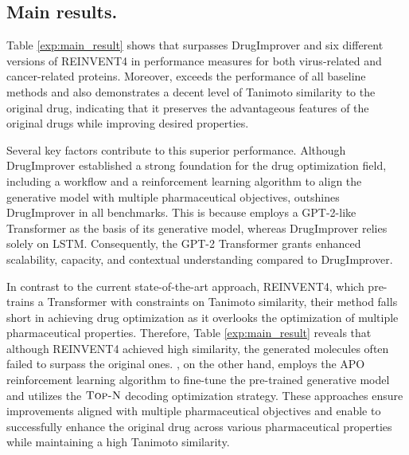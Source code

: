 \subsection{Main results.}
        
    














        
        
    




Table \ref{exp:main_result} shows that \algname surpasses DrugImprover and six different versions of REINVENT4 in performance measures for both virus-related and cancer-related proteins. Moreover, \algname exceeds the performance of all baseline methods and also demonstrates a decent level of Tanimoto similarity to the original drug, indicating that it preserves the advantageous features of the original drugs while improving desired properties.

Several key factors contribute to this superior performance. Although DrugImprover established a strong foundation for the drug optimization field, including a workflow and a reinforcement learning algorithm to align the generative model with multiple pharmaceutical objectives, \algname outshines DrugImprover in all benchmarks. This is because \algname employs a GPT-2-like Transformer as the basis of its generative model, whereas DrugImprover relies solely on LSTM. Consequently, the GPT-2 Transformer grants \algname enhanced scalability, capacity, and contextual understanding compared to DrugImprover.




In contrast to the current state-of-the-art approach, REINVENT4, which pre-trains a Transformer with constraints on Tanimoto similarity, their method falls short in achieving drug optimization as it overlooks the optimization of multiple pharmaceutical properties. Therefore, Table \ref{exp:main_result} reveals that although REINVENT4 achieved high similarity, the generated molecules often failed to surpass the original ones.
\algname, on the other hand, employs the APO reinforcement learning algorithm to fine-tune the pre-trained generative model and utilizes the $\textsc{Top-N}$ decoding optimization strategy. These approaches ensure improvements aligned with multiple pharmaceutical objectives and enable \algname to successfully enhance the original drug across various pharmaceutical properties while maintaining a high Tanimoto similarity.






